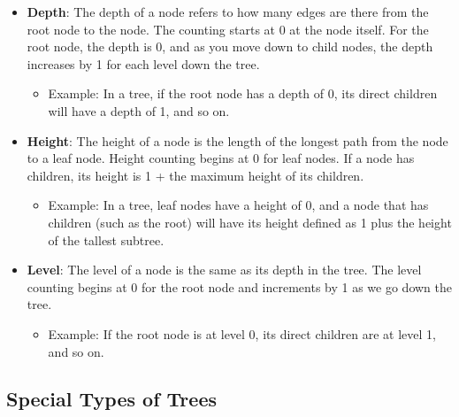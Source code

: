 \documentclass{book}
\begin{document}
\begin{itemize}
    \item \textbf{Depth}: 
    The depth of a node refers to how many edges are there from the root node to the node. The counting starts at 0 at the node itself. For the root node, the depth is 0, and as you move down to child nodes, the depth increases by 1 for each level down the tree.
    \begin{itemize}
        \item Example: In a tree, if the root node has a depth of 0, its direct children will have a depth of 1, and so on.
    \end{itemize}
    
    \item \textbf{Height}: 
    The height of a node is the length of the longest path from the node to a leaf node. Height counting begins at 0 for leaf nodes. If a node has children, its height is 1 + the maximum height of its children.
    \begin{itemize}
        \item Example: In a tree, leaf nodes have a height of 0, and a node that has children (such as the root) will have its height defined as 1 plus the height of the tallest subtree.
    \end{itemize}
    
    \item \textbf{Level}: 
    The level of a node is the same as its depth in the tree. The level counting begins at 0 for the root node and increments by 1 as we go down the tree.
    \begin{itemize}
        \item Example: If the root node is at level 0, its direct children are at level 1, and so on.
    \end{itemize}
\end{itemize}

\subsection{Special Types of Trees}
\end{document}
